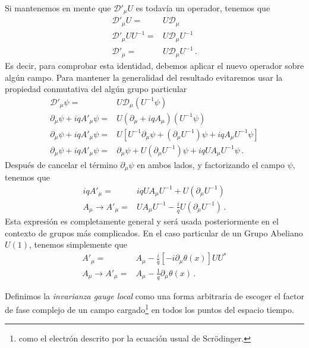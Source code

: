 Si mantenemos en mente que  $\mathcal{D}'_\mu U$ es todavía un operador, tenemos que
\begin{align}
    \mathcal{D}'_\mu U=&U\mathcal{D}_\mu \nonumber\\
    \mathcal{D}'_\mu UU^{-1}=&U\mathcal{D}_\mu U^{-1} \nonumber\\
    \mathcal{D}'_\mu =&U\mathcal{D}_\mu U^{-1} \,.
\end{align}
Es decir, para comprobar esta identidad, debemos aplicar el nuevo operador sobre algún campo. Para mantener la generalidad del resultado evitaremos usar la propiedad conmutativa del algún grupo particular
\begin{align*}
    \mathcal{D}'_\mu \psi =&U\mathcal{D}_\mu \left(U^{-1}\psi  \right) \nonumber\\
    \partial_{\mu}\psi+iq A'_{\mu} \psi =&U \left(\partial_{\mu}+iq A_{\mu}  \right) \left(U^{-1}\psi  \right) \nonumber\\
    \partial_{\mu}\psi+iq A'_{\mu} \psi =&U \left[U^{-1}\partial_{\mu}\psi+\left( \partial_{\mu}U^{-1} \right)\psi+iq  A_{\mu}U^{-1}\psi\right] \nonumber\\
    \partial_{\mu}\psi+iq A'_{\mu} \psi =&\partial_{\mu}\psi+U\left( \partial_{\mu}U^{-1} \right)\psi+iq  U A_{\mu}U^{-1}\psi\,.
\end{align*}
Después de cancelar el término  $\partial_{\mu}\psi$ en ambos lados, y factorizando el campo  $\psi$, tenemos que
\begin{align}
      iq A'_{\mu} =&iq  U A_{\mu}U^{-1}+ U\left( \partial_{\mu}U^{-1} \right)\nonumber\\
      A_{\mu}\to A'_{\mu} =&U A_{\mu}U^{-1}-\frac{i}{q}U\left( \partial_{\mu}U^{-1} \right)\,.
\end{align}
Esta expresión es completamente general y será usada posteriormente en el contexto de grupos más complicados. En el caso particular de un Grupo Abeliano  $U(1)$, tenemos simplemente que
\begin{align}
  A'_{\mu}=&A_{\mu}-\frac{i}{q}\left[ -i\partial_{\mu}\theta(x) \right]UU^{*}\nonumber\\
 A_{\mu}\to  A'_{\mu}=&A_{\mu}-\frac{1}{q}\partial_{\mu}\theta(x)\,.
\end{align}

Definimos la \emph{invarianza gauge local} como una forma arbitraria de escoger el factor de fase complejo de un campo cargado\footnote{como el electrón descrito por la ecuación usual de  Scrödinger.} en todos los puntos del espacio tiempo.

